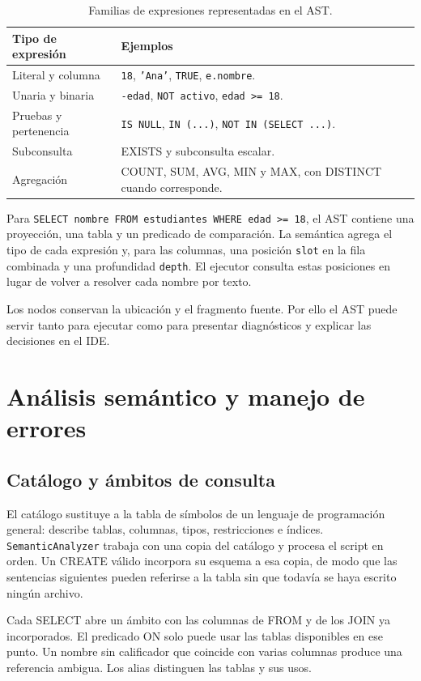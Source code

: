 \documentclass[11pt,a4paper]{article}
\begin{document}
\begin{table}[H]\centering\small
\begin{tabularx}{\textwidth}{@{}L{3.6cm}Y@{}}
\toprule\textbf{Tipo de expresión} & \textbf{Ejemplos}\\\midrule
Literal y columna & \texttt{18}, \texttt{'Ana'}, \texttt{TRUE}, \texttt{e.nombre}.\\
Unaria y binaria & \texttt{-edad}, \texttt{NOT activo}, \texttt{edad >= 18}.\\
Pruebas y pertenencia & \texttt{IS NULL}, \texttt{IN (...)}, \texttt{NOT IN (SELECT ...)}.\\
Subconsulta & EXISTS y subconsulta escalar.\\
Agregación & COUNT, SUM, AVG, MIN y MAX, con DISTINCT cuando corresponde.\\
\bottomrule
\end{tabularx}
\caption{Familias de expresiones representadas en el AST.}
\end{table}

Para \texttt{SELECT nombre FROM estudiantes WHERE edad >= 18}, el AST
contiene una proyección, una tabla y un predicado de comparación. La
semántica agrega el tipo de cada expresión y, para las columnas, una
posición \texttt{slot} en la fila combinada y una profundidad
\texttt{depth}. El ejecutor consulta estas posiciones en lugar de volver
a resolver cada nombre por texto.

Los nodos conservan la ubicación y el fragmento fuente. Por ello el AST
puede servir tanto para ejecutar como para presentar diagnósticos y
explicar las decisiones en el IDE.

\section{Análisis semántico y manejo de errores}
\subsection{Catálogo y ámbitos de consulta}

El catálogo sustituye a la tabla de símbolos de un lenguaje de programación
general: describe tablas, columnas, tipos, restricciones e índices.
\texttt{SemanticAnalyzer} trabaja con una copia del catálogo y procesa
el script en orden. Un CREATE válido incorpora su esquema a esa copia,
de modo que las sentencias siguientes pueden referirse a la tabla sin
que todavía se haya escrito ningún archivo.

Cada SELECT abre un ámbito con las columnas de FROM y de los JOIN ya
incorporados. El predicado ON solo puede usar las tablas disponibles en
ese punto. Un nombre sin calificador que coincide con varias columnas
produce una referencia ambigua. Los alias distinguen las tablas y sus usos.
\end{document}
